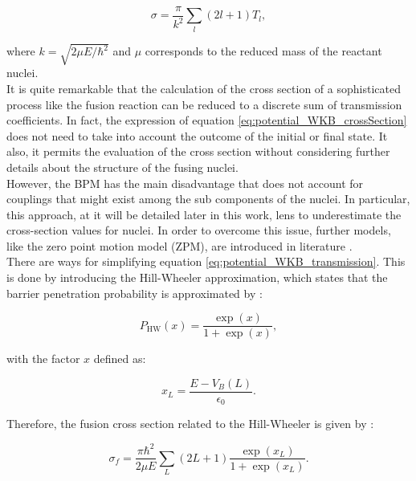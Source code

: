 \documentclass[openany]{book}
\begin{document}
\begin{equation} \label{eq:potential_WKB_crossSection}
	\sigma = \frac{\pi}{k^2} \sum_{l}{(2l + 1)T_l},  
\end{equation}

where $k = \sqrt{2\mu E / \hbar^2}$ and $\mu$ corresponds to the reduced mass of the reactant nuclei.  \\

It is quite remarkable that the calculation of the cross section of a sophisticated process like the fusion reaction can be reduced to a discrete sum of transmission coefficients. In fact, the expression of equation \ref{eq:potential_WKB_crossSection} does not need to take into account the outcome of the initial or final state. It also, it permits the evaluation of the cross section without considering further details about the structure of the fusing nuclei.  \\

However, the BPM has the main disadvantage that does not account for couplings that might exist among the sub components of the nuclei. In particular, this approach, at it will be detailed later in this work, lens to underestimate the cross-section values for nuclei. In order to overcome this issue, further models, like the zero point motion model (ZPM), are introduced in literature \cite{duarte_gasques_oliveira_zagatto_chamon_medina_added_seale_alcantara-nunez_rossi_et_2015, nobre_chamon_gasques_carlson_thompson_2007}.   \\  

There are ways for simplifying equation   \ref{eq:potential_WKB_transmission}. This is done by introducing the Hill-Wheeler approximation, which states that the barrier penetration probability is approximated by \cite{hill_wheeler_1953}:

\begin{equation}\label{eq:potential_hillWheeler}
	P_{\mathrm{HW}}(x) = \frac{\exp(x)}{1 + \exp(x)},
\end{equation}

with the factor $x$ defined as: 

\begin{equation}\label{eq:potential_hillWheeler_x}
	x_L = \frac{E - V_B(L)}{\epsilon_0}.
\end{equation}

Therefore, the fusion cross section related to the Hill-Wheeler is given by \cite{esbensen_2012}:

\begin{equation}\label{eq:potential_hillWheeler_crossSection}
	\sigma_f = \frac{\pi \hbar^2}{2\mu E} \sum_{L} (2L + 1)   \frac{\exp(x_L)}{1 + \exp(x_L)}.
\end{equation}
\end{document}
